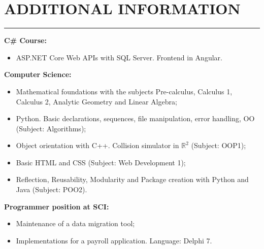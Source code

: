 \documentclass[11pt]{article}
\begin{document}
\vspace{1.0em}\section*{ADDITIONAL INFORMATION}
\hrule
\begin{flushleft}
\begin{multicols}{2}
    \vspace{0.1em} 
    
    \textbf{C\# Course:} \\
    \begin{itemize}[leftmargin=*]
        \item ASP.NET Core Web APIs with SQL Server. Frontend in Angular.
    \end{itemize}

    \textbf{Computer Science:} \\
    \begin{itemize}[leftmargin=*]
        \item Mathematical foundations with the subjects Pre-calculus, Calculus 1, Calculus 2, Analytic Geometry and Linear Algebra;
        \item Python. Basic declarations, sequences, file manipulation, error handling, OO (Subject: Algorithms);
        \item Object orientation with C++. Collision simulator in $\mathbb{R}^2$ (Subject: OOP1);
        \item Basic HTML and CSS (Subject: Web Development 1);
        \item Reflection, Reusability, Modularity and Package creation with Python and Java (Subject: POO2).
    \end{itemize}

    \textbf{Programmer position at SCI:} \\
    \begin{itemize}[leftmargin=*]
        \item Maintenance of a data migration tool;
        \item Implementations for a payroll application. Language: Delphi 7.
    \end{itemize}
    
\end{multicols}
\end{flushleft}
\end{document}

